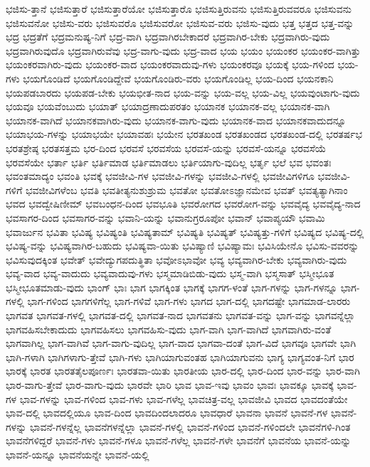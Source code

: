 {ಭಜಿಸು-ತ್ತಾನೆ
ಭಜಿಸುತ್ತಾರೆ
ಭಜಿಸುತ್ತಾರೆಯೋ
ಭಜಿಸುತ್ತಾರೊ
ಭಜಿಸುತ್ತಿರುವನು
ಭಜಿಸುತ್ತಿರುವವರೂ
ಭಜಿಸುವನು
ಭಜಿಸುವನೋ
ಭಜಿಸು-ವರು
ಭಜಿಸುವರೊ
ಭಜಿಸುವರೋ
ಭಜಿಸುವ-ವರು
ಭಜಿಸು-ವುದು
ಭತ್ತ
ಭತ್ತದ
ಭತ್ತ-ವನ್ನು
ಭದ್ರ
ಭದ್ರತೆಗೆ
ಭದ್ರಮನುಷ್ಯ-ನಿಗೆ
ಭದ್ರ-ವಾಗಿ
ಭದ್ರವಾಗಿರಬೇಕಾದರೆ
ಭದ್ರವಾಗಿರ-ಬೇಕು
ಭದ್ರವಾಗಿರು-ವುದು
ಭದ್ರವಾಗಿರುವುದೊ
ಭದ್ರವಾಗಿರುವೆವು
ಭದ್ರ-ವಾಗು-ವುದು
ಭದ್ರ-ವಾದ
ಭಯ
ಭಯಂ
ಭಯಂಕರ
ಭಯಂಕರ-ವಾಗಿತ್ತು
ಭಯಂಕರವಾಗಿರು-ವುದು
ಭಯಂಕರ-ವಾದ
ಭಯಂಕರವಾದುವು-ಗಳು
ಭಯಂಕರವೂ
ಭಯಕ್ಕೆ
ಭಯ-ಗಳಿಂದ
ಭಯ-ಗಳು
ಭಯಗೊಂಡಿದೆ
ಭಯಗೊಂಡಿದ್ದೇವೆ
ಭಯಗೊಂಡಿರು-ವರು
ಭಯಗೊಂಡಿಲ್ಲ
ಭಯ-ದಿಂದ
ಭಯನಕಾನಿ
ಭಯಪಡಬಾರದು
ಭಯಪಡ-ಬೇಕು
ಭಯಭೀತ-ನಾದ
ಭಯ-ವನ್ನು
ಭಯ-ವಲ್ಲ
ಭಯ-ವಿಲ್ಲ
ಭಯವುಂಟಾಗು-ವುದು
ಭಯವೂ
ಭಯವೆಂಬುದು
ಭಯಾತ್
ಭಯಾದ್ರಣಾದುಪರತಂ
ಭಯಾನಕ
ಭಯಾನಕ-ವಲ್ಲ
ಭಯಾನಕ-ವಾಗಿ
ಭಯಾನಕ-ವಾಗಿದೆ
ಭಯಾನಕವಾಗಿರು-ವುದು
ಭಯಾನಕ-ವಾಗು-ವುದು
ಭಯಾನಕ-ವಾದ
ಭಯಾನಕವಾದುದನ್ನೂ
ಭಯಾಭಯ-ಗಳನ್ನು
ಭಯಾಭಯೇ
ಭಯಾವಹಃ
ಭಯೇನ
ಭರತಖಂಡ
ಭರತಖಂಡದ
ಭರತಖಂಡ-ದಲ್ಲಿ
ಭರತರ್ಷಭ
ಭರತಶ್ರೇಷ್ಠ
ಭರತಸತ್ತಮ
ಭರ-ದಿಂದ
ಭರವಸೆ
ಭರವಸೆಯ
ಭರವಸೆ-ಯನ್ನು
ಭರವಸೆ-ಯನ್ನೂ
ಭರವಸೆಯೆ
ಭರವಸೆಯೇ
ಭರ್ತಾ
ಭರ್ತಿ
ಭರ್ತಿಮಾಡ
ಭರ್ತಿಮಾಡಲು
ಭರ್ತಿಯಾಗು-ವುದಿಲ್ಲ
ಭರ್ತೃ
ಭಲೆ
ಭವ
ಭವಂತಃ
ಭವಂತಮಾದ್ಯಂ
ಭವಂತಿ
ಭವಕ್ಕೆ
ಭವಜೀವಿ-ಗಳ
ಭವಜೀವಿ-ಗಳನ್ನು
ಭವಜೀವಿ-ಗಳಲ್ಲಿ
ಭವಜೀವಿಗಳಿಗೂ
ಭವಜೀವಿ-ಗಳಿಗೆ
ಭವಜೀವಿಗಳೆಂಬ
ಭವತಿ
ಭವತೀತ್ಯನುಶುಶ್ರುಮ
ಭವತೋ
ಭವತೋಽಜ್ಞಾನಮೇವ
ಭವತ್
ಭವತ್ಯತ್ಯಾಗಿನಾಂ
ಭವದ
ಭವದ್ವೇಷಿಣೀಮ್
ಭವಬಂಧನ-ದಿಂದ
ಭವಭೂತಿ
ಭವರೋಗದ
ಭವರೋಗ-ವನ್ನು
ಭವವೈದ್ಯ
ಭವವೈದ್ಯ-ನಾದ
ಭವಸಾಗರ-ದಿಂದ
ಭವಸಾಗರ-ವನ್ನು
ಭವಾನಿ-ಯನ್ನು
ಭವಾನುಗ್ರರೂಪೋ
ಭವಾನ್
ಭವಾಪ್ಯಯೌ
ಭವಾಮಿ
ಭವಾರ್ಜುನ
ಭವಿತಾ
ಭವಿಷ್ಯ
ಭವಿಷ್ಯಂತಿ
ಭವಿಷ್ಯತಾಮ್
ಭವಿಷ್ಯತಿ
ಭವಿಷ್ಯತ್
ಭವಿಷ್ಯತ್ತು-ಗಳಿಗೆ
ಭವಿಷ್ಯದ
ಭವಿಷ್ಯ-ದಲ್ಲಿ
ಭವಿಷ್ಯ-ವನ್ನು
ಭವಿಷ್ಯವಾಗಿರ-ಬಹುದು
ಭವಿಷ್ಯವಾ-ಯಿತು
ಭವಿಷ್ಯಾಣಿ
ಭವಿಷ್ಯಾಮಃ
ಭವಿಸಿಯೇನೊ
ಭವಿಸು-ವವರನ್ನು
ಭವಿಸುವುದಕ್ಕಿಂತ
ಭವೇತ್
ಭವೇದ್ಯುಗಪದುತ್ಥಿತಾ
ಭವೋಽಭಾವೋ
ಭವ್ಯ
ಭವ್ಯವಾಗಿರ-ಬೇಕು
ಭವ್ಯವಾಗಿರು-ವುದು
ಭವ್ಯ-ವಾದ
ಭವ್ಯ-ವಾದುದು
ಭವ್ಯವಾದುವು-ಗಳು
ಭಸ್ಮಮಾಡಿಬಿಡು-ವುದು
ಭಸ್ಮ-ವಾಗಿ
ಭಸ್ಮಸಾತ್
ಭಸ್ಮೀಭೂತ
ಭಸ್ಮೀಭೂತಮಾಡು-ವುದು
ಭಾಂಗ್
ಭಾಃ
ಭಾಗ
ಭಾಗಕ್ಕಿಂತ
ಭಾಗಕ್ಕೆ
ಭಾಗಗ-ಳಂತೆ
ಭಾಗ-ಗಳನ್ನು
ಭಾಗ-ಗಳನ್ನೂ
ಭಾಗ-ಗಳಲ್ಲಿ
ಭಾಗ-ಗಳಿಂದ
ಭಾಗಗಳಿಗೆಲ್ಲ
ಭಾಗ-ಗಳಿವೆ
ಭಾಗ-ಗಳು
ಭಾಗದ
ಭಾಗ-ದಲ್ಲಿ
ಭಾಗದಷ್ಟೇ
ಭಾಗಮಾಡ-ಲಾರರು
ಭಾಗವತ
ಭಾಗವತ-ಗಳಲ್ಲಿ
ಭಾಗವತ-ದಲ್ಲಿ
ಭಾಗವತ-ನಾದ
ಭಾಗವತನು
ಭಾಗವತ-ವನ್ನು
ಭಾಗ-ವನ್ನು
ಭಾಗವನ್ನೆಲ್ಲಾ
ಭಾಗವಹಿಸಬೇಕಾದುದು
ಭಾಗವಹಿಸಲು
ಭಾಗವಹಿಸು-ವುದು
ಭಾಗ-ವಾಗಿ
ಭಾಗ-ವಾಗಿದೆ
ಭಾಗವಾಗಿರು-ವಂತೆ
ಭಾಗವಾಗಿಲ್ಲ
ಭಾಗ-ವಾಗಿವೆ
ಭಾಗ-ವಾಗು-ವುದಿಲ್ಲ
ಭಾಗ-ವಾದ
ಭಾಗವಾ-ದಂತೆ
ಭಾಗ-ವಿದೆ
ಭಾಗವೂ
ಭಾಗವೇ
ಭಾಗಿ
ಭಾಗಿ-ಗಳಾಗಿ
ಭಾಗಿಗಳಾಗು-ತ್ತೇವೆ
ಭಾಗಿ-ಗಳು
ಭಾಗಿಯಾಗುವಂತಹ
ಭಾಗಿಯಾಗುವನು
ಭಾಗ್ಯ
ಭಾಗ್ಯವಂತ-ನಿಗೆ
ಭಾರ
ಭಾರಕ್ಕೆ
ಭಾರತ
ಭಾರತತೈಲಪೂರ್ಣಃ
ಭಾರತವಾ-ಯಿತು
ಭಾರತೀಯ
ಭಾರ-ದಲ್ಲಿ
ಭಾರ-ದಿಂದ
ಭಾರ-ವನ್ನು
ಭಾರ-ವಾಗಿ
ಭಾರ-ವಾಗು-ತ್ತೇವೆ
ಭಾರ-ವಾಗು-ವುದು
ಭಾರವೇ
ಭಾರಿ
ಭಾವ
ಭಾವ-ಇವು
ಭಾವಂ
ಭಾವಃ
ಭಾವಕ್ಕೂ
ಭಾವಕ್ಕೆ
ಭಾವ-ಗಳ
ಭಾವ-ಗಳನ್ನು
ಭಾವ-ಗಳಿಂದ
ಭಾವ-ಗಳು
ಭಾವ-ಗಳೆಲ್ಲ
ಭಾವಚಿತ್ರ-ವಲ್ಲ
ಭಾವಜೀವಿ
ಭಾವದ
ಭಾವದಂತೆಯೇ
ಭಾವ-ದಲ್ಲಿ
ಭಾವದಲ್ಲಿಯೂ
ಭಾವ-ದಿಂದ
ಭಾವದಿಂದಲಾದರೂ
ಭಾವಧಾರೆ
ಭಾವನಾ
ಭಾವನೆ
ಭಾವನೆ-ಗಳ
ಭಾವನೆ-ಗಳನ್ನು
ಭಾವನೆ-ಗಳನ್ನೆಲ್ಲ
ಭಾವನೆಗಳನ್ನೆಲ್ಲಾ
ಭಾವನೆ-ಗಳಲ್ಲಿ
ಭಾವನೆ-ಗಳಿಂದ
ಭಾವನೆ-ಗಳಿಂದಲೇ
ಭಾವನೆಗಳಿ-ಗಿಂತ
ಭಾವನೆಗಳಿದ್ದರೆ
ಭಾವನೆ-ಗಳು
ಭಾವನೆ-ಗಳೂ
ಭಾವನೆ-ಗಳೆಲ್ಲ
ಭಾವನೆ-ಗಳೇ
ಭಾವನೆಗೆ
ಭಾವನೆಯ
ಭಾವನೆ-ಯನ್ನು
ಭಾವನೆ-ಯನ್ನೂ
ಭಾವನೆಯನ್ನೇ
ಭಾವನೆ-ಯಲ್ಲಿ
}
